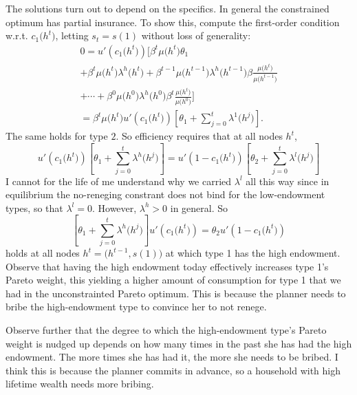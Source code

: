\documentclass[11pt,letterpaper,reqno,oneside]{article}
\begin{document}
The solutions turn out to depend on the specifics. In general the constrained optimum has partial insurance. To show this, compute the first-order condition w.r.t. $c_1\bigl( h^t \bigr)$, letting $s_t = s(1)$ without loss of generality:
%
\begin{multline*}
	0 
	= u'(c_1\bigl(h^t\bigr)) \Bigg[
	\beta^t \mu\bigl(h^t\bigr) \theta_1 
	\\ 
	+ \beta^t \mu\bigl(h^t\bigr) \lambda^h\bigl(h^t\bigr)
	+ \beta^{t-1} \mu\bigl(h^{t-1}\bigr) \lambda^h\bigl(h^{t-1}\bigr) 
		\beta \frac{\mu\bigl(h^t\bigr)}{\mu\bigl(h^{t-1}\bigr)}
	\\ 
	+ \cdots
	+ \beta^0 \mu\bigl(h^0\bigr) \lambda^h\bigl(h^0\bigr) 
		\beta^t \frac{\mu\bigl(h^t\bigr)}{\mu\bigl(h^0\bigr)}
	\Bigg]
	\\ 
	= \beta^t \mu\bigl(h^t\bigr) u'\left(c_1\bigl(h^t\bigr)\right) \left[
	\theta_1 + \sum_{j=0}^t \lambda^1\bigl(h^j\bigr)
	\right] .
\end{multline*}
%
The same holds for type $2$. So efficiency requires that at all nodes $h^t$,
%
\begin{equation*}
	u'\left( c_1\bigl(h^t\bigr) \right) \left[
	\theta_1 + \sum_{j=0}^t \lambda^h\bigl(h^j\bigr)
	\right]
	=
	u'\left( 1 - c_1\bigl(h^t\bigr) \right) \left[
	\theta_2 + \sum_{j=0}^t \lambda^l\bigl(h^j\bigr)
	\right]
\end{equation*}
%
I cannot for the life of me understand why we carried $\lambda^l$ all this way since in equilibrium the no-reneging constrant does not bind for the low-endowment types, so that $\lambda^l = 0$. However, $\lambda^h > 0$ in general. So
%
\begin{equation*}
	\left[
	\theta_1 + \sum_{j=0}^t \lambda^h\bigl(h^j\bigr)
	\right]
	u'\left( c_1\bigl(h^t\bigr) \right) 
	=
	\theta_2 u'\left( 1 - c_1\bigl(h^t\bigr) \right) 
\end{equation*}
%
holds at all nodes $h^t = \bigl( h^{t-1}, s(1) \bigr)$ at which type 1 has the high endowment. Observe that having the high endowment today effectively increases type 1's Pareto weight, this yielding a higher amount of consumption for type 1 that we had in the unconstrainted Pareto optimum. This is because the planner needs to bribe the high-endowment type to convince her to not renege.

Observe further that the degree to which the high-endowment type's Pareto weight is nudged up depends on how many times in the past she has had the high endowment. The more times she has had it, the more she needs to be bribed. I think this is because the planner commits in advance, so a household with high lifetime wealth needs more bribing.
\end{document}
